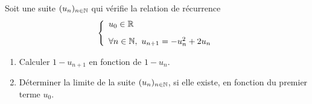 \documentclass[a4paper, 11pt]{article}
\begin{document}
\vspace{0.5cm}

\begin{exercice} \;
Soit une suite $(u_n)_{n\in \mathbb{N}}$ qui v\'erifie la relation de r\'ecurrence
$$\left\lbrace\begin{array}{l}
u_0\in\R\vsec\\
\forall n\in\N,\ u_{n+1}=-u_n^2+2u_n
\end{array}\right.$$
\begin{enumerate}
 \item 
Calculer $1-u_{n+1}$ en fonction de $1-u_n$.
\item 
D\'eterminer la limite de la suite $(u_n)_{n\in \mathbb{N}}$, si elle existe, en fonction du premier terme $u_0$.
\end{enumerate}
\vspace{0.5cm}
\end{exercice}
\end{document}

